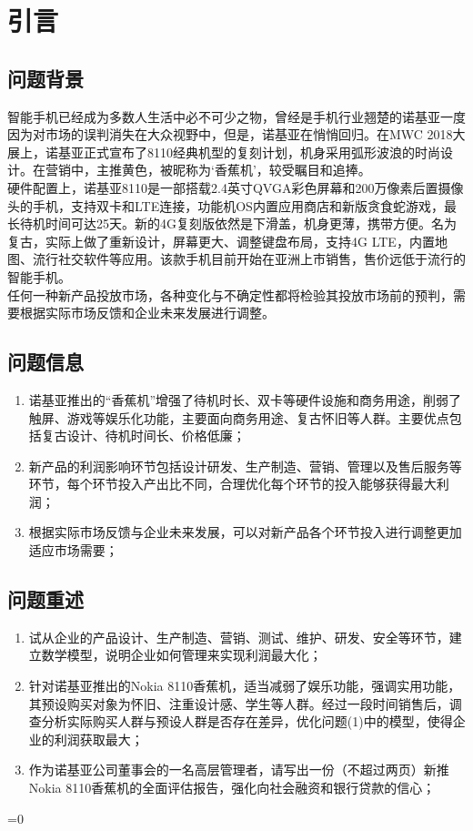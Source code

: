 \documentclass{article}
\begin{document}
\fi
\clearpage
\setcounter{section}{-1}
\section{引言}
\subsection{问题背景}
智能手机已经成为多数人生活中必不可少之物，曾经是手机行业翘楚的诺基亚一度因为对市场的误判消失在大众视野中，但是，诺基亚在悄悄回归。在MWC 2018大展上，诺基亚正式宣布了8110经典机型的复刻计划，机身采用弧形波浪的时尚设计。在营销中，主推黄色，被昵称为‘香蕉机'，较受瞩目和追捧。
\\\indent 硬件配置上，诺基亚8110是一部搭载2.4英寸QVGA彩色屏幕和200万像素后置摄像头的手机，支持双卡和LTE连接，功能机OS内置应用商店和新版贪食蛇游戏，最长待机时间可达25天。新的4G复刻版依然是下滑盖，机身更薄，携带方便。名为复古，实际上做了重新设计，屏幕更大、调整键盘布局，支持4G LTE，内置地图、流行社交软件等应用。该款手机目前开始在亚洲上市销售，售价远低于流行的智能手机。
\\\indent 任何一种新产品投放市场，各种变化与不确定性都将检验其投放市场前的预判，需要根据实际市场反馈和企业未来发展进行调整。
\subsection{问题信息}
\begin{enumerate}
	\item 诺基亚推出的“香蕉机”增强了待机时长、双卡等硬件设施和商务用途，削弱了触屏、游戏等娱乐化功能，主要面向商务用途、复古怀旧等人群。主要优点包括复古设计、待机时间长、价格低廉；
	\item 新产品的利润影响环节包括设计研发、生产制造、营销、管理以及售后服务等环节，每个环节投入产出比不同，合理优化每个环节的投入能够获得最大利润；
	\item 根据实际市场反馈与企业未来发展，可以对新产品各个环节投入进行调整更加适应市场需要；
\end{enumerate}
\subsection{问题重述}
\begin{enumerate}
	\item 试从企业的产品设计、生产制造、营销、测试、维护、研发、安全等环节，建立数学模型，说明企业如何管理来实现利润最大化；
	\item 针对诺基亚推出的Nokia 8110香蕉机，适当减弱了娱乐功能，强调实用功能，其预设购买对象为怀旧、注重设计感、学生等人群。经过一段时间销售后，调查分析实际购买人群与预设人群是否存在差异，优化问题(1)中的模型，使得企业的利润获取最大；
	\item 作为诺基亚公司董事会的一名高层管理者，请写出一份（不超过两页）新推Nokia 8110香蕉机的全面评估报告，强化向社会融资和银行贷款的信心；
\end{enumerate}
\ifnum{}=0
	
\end{document}
